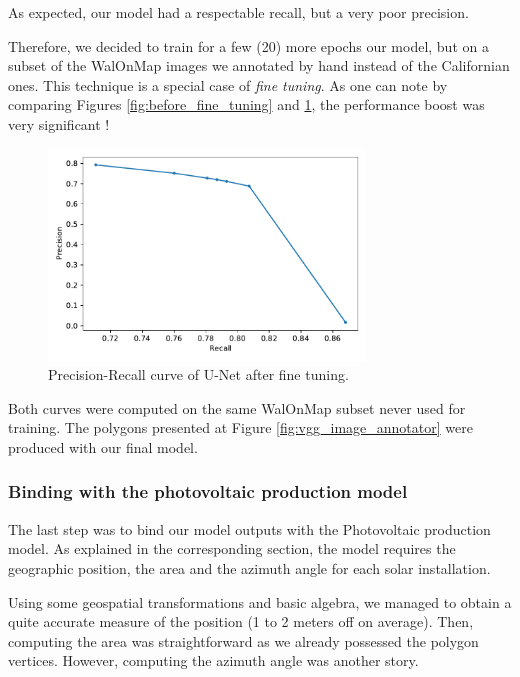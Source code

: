 \documentclass[a4paper, 12pt]{article}
\begin{document}
As expected, our model had a respectable recall, but a very poor precision.

Therefore, we decided to train for a few (20) more epochs our model, but on a subset of the WalOnMap images we annotated by hand instead of the Californian ones. This technique is a special case of \emph{fine tuning}. As one can note by comparing Figures \ref{fig:before_fine_tuning} and \ref{fig:after_fine_tuning}, the performance boost was very significant !

\begin{figure}[h]
    \centering
    \includegraphics[width=0.75\textwidth]{resources/pdf/precision_recall_after.pdf}
    \caption{Precision-Recall curve of U-Net after fine tuning.}
    \label{fig:after_fine_tuning}
\end{figure}

\begin{note}
    Both curves were computed on the same WalOnMap subset never used for training. The polygons presented at Figure \ref{fig:vgg_image_annotator} were produced with our final model.
\end{note}

\subsubsection{Binding with the photovoltaic production model}

The last step was to bind our model outputs with the Photovoltaic production model. As explained in the corresponding section, the model requires the geographic position, the area and the azimuth angle for each solar installation.

Using some geospatial transformations and basic algebra, we managed to obtain a quite accurate measure of the position (1 to 2 meters off on average). Then, computing the area was straightforward as we already possessed the polygon vertices. However, computing the azimuth angle was another story.
\end{document}
